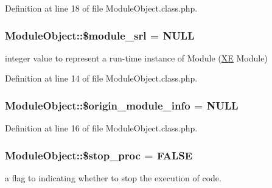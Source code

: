 Definition at line 18 of file Module\+Object.\+class.\+php.

\subsubsection[{\texorpdfstring{\$module\+\_\+srl}{$module_srl}}]{\setlength{\rightskip}{0pt plus 5cm}Module\+Object\+::\$module\+\_\+srl = N\+U\+LL}\hypertarget{classModuleObject_a0da50016ddc31513f563206fdf6f413d}{}\label{classModuleObject_a0da50016ddc31513f563206fdf6f413d}


integer value to represent a run-\/time instance of Module (\hyperlink{namespaceXE}{XE} Module) 



Definition at line 14 of file Module\+Object.\+class.\+php.

\subsubsection[{\texorpdfstring{\$origin\+\_\+module\+\_\+info}{$origin_module_info}}]{\setlength{\rightskip}{0pt plus 5cm}Module\+Object\+::\$origin\+\_\+module\+\_\+info = N\+U\+LL}\hypertarget{classModuleObject_a6bdf7982a5defc9d618c2dd1b700e876}{}\label{classModuleObject_a6bdf7982a5defc9d618c2dd1b700e876}


Definition at line 16 of file Module\+Object.\+class.\+php.

\subsubsection[{\texorpdfstring{\$stop\+\_\+proc}{$stop_proc}}]{\setlength{\rightskip}{0pt plus 5cm}Module\+Object\+::\$stop\+\_\+proc = F\+A\+L\+SE}\hypertarget{classModuleObject_ad4efa1b4c623247763e4d56f76c5fb1c}{}\label{classModuleObject_ad4efa1b4c623247763e4d56f76c5fb1c}


a flag to indicating whether to stop the execution of code. 



